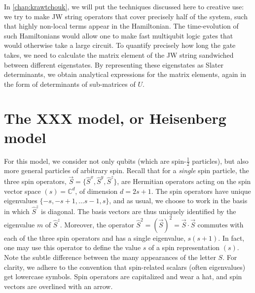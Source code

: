 In \cref{chap:krawtchouk}, we will put the techniques discussed here to creative use: we try to make JW string operators that cover precisely half of the system, such that highly non-local terms appear in the Hamiltonian. The time-evolution of such Hamiltonians would allow one to make fast multiqubit logic gates that would otherwise take a large circuit. To quantify precisely how long the gate takes, we need to calculate the matrix element of the JW string sandwiched between different eigenstates. By representing these eigenstates as Slater determinants, we obtain analytical expressions for the matrix elements, again in the form of determinants of sub-matrices of $U$. 


\section{The XXX model, or Heisenberg model}
\label{sec:XXXmodel}
For this model, we consider not only qubits (which are spin-$\frac{1}{2}$ particles), but also more general particles of arbitrary spin. Recall that for a \emph{single} spin particle, the three spin operators, $\vec{S} = \{ \hat{S}^x, \hat{S}^y, \hat{S}^z \}$, are Hermitian operators acting on the spin vector space $(s) = \mathbb{C}^d$, of dimension $d =2s+1$. The spin operators have unique eigenvalues $\{-s, -s+1, \ldots s-1, s\}$, and as usual, we choose to work in the basis in which $\hat{S}^z$ is diagonal. The basis vectors are thus uniquely identified by the eigenvalue $m$ of $\hat{S}^z$. Moreover, the operator $\hat{S}^2 = (\vec{S})^2 = \vec{S} \cdot \vec{S}$ commutes with each of the three spin operators and has a single eigenvalue, $s(s+1)$. In fact, one may use this operator to define the value $s$ of a spin representation $(s)$. Note the subtle difference between the many appearances of the letter $S$. For clarity, we adhere to the convention that spin-related scalars (often eigenvalues) get lowercase symbols. Spin operators are capitalized and wear a hat, and spin vectors are overlined with an arrow. 

